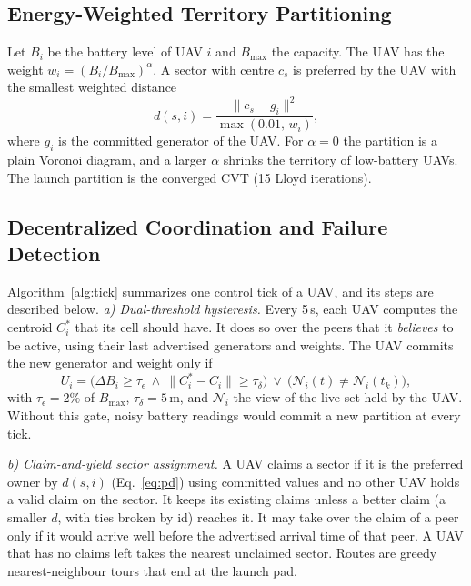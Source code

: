 \documentclass[conference]{IEEEtran}
\begin{document}
\subsection{Energy-Weighted Territory Partitioning}
Let $B_i$ be the battery level of UAV $i$ and $B_{\max}$ the capacity. The UAV has the weight $w_i=(B_i/B_{\max})^{\alpha}$. A sector with centre $c_s$ is preferred by the UAV with the smallest weighted distance
\begin{equation}
d(s,i)=\frac{\lVert c_s-g_i\rVert^2}{\max(0.01,\,w_i)},
\label{eq:pd}
\end{equation}
where $g_i$ is the committed generator of the UAV. For $\alpha=0$ the partition is a plain Voronoi diagram, and a larger $\alpha$ shrinks the territory of low-battery UAVs. The launch partition is the converged CVT (15 Lloyd iterations).

\subsection{Decentralized Coordination and Failure Detection}
Algorithm~\ref{alg:tick} summarizes one control tick of a UAV, and its steps are described below.
\emph{a) Dual-threshold hysteresis.} Every 5\,s, each UAV computes the centroid $C_i^*$ that its cell should have. It does so over the peers that it \emph{believes} to be active, using their last advertised generators and weights. The UAV commits the new generator and weight only if
\begin{equation}
U_i=\big(\Delta B_i\ge\tau_\epsilon\ \wedge\ \lVert C_i^*-C_i\rVert\ge\tau_\delta\big)\ \vee\ \big(\mathcal N_i(t)\ne\mathcal N_i(t_k)\big),
\label{eq:commit}
\end{equation}
with $\tau_\epsilon=2\%$ of $B_{\max}$, $\tau_\delta=5$\,m, and $\mathcal N_i$ the view of the live set held by the UAV. Without this gate, noisy battery readings would commit a new partition at every tick.

\emph{b) Claim-and-yield sector assignment.} A UAV claims a sector if it is the preferred owner by $d(s,i)$ (Eq.~\ref{eq:pd}) using committed values and no other UAV holds a valid claim on the sector. It keeps its existing claims unless a better claim (a smaller $d$, with ties broken by id) reaches it. It may take over the claim of a peer only if it would arrive well before the advertised arrival time of that peer. A UAV that has no claims left takes the nearest unclaimed sector. Routes are greedy nearest-neighbour tours that end at the launch pad.
\end{document}
